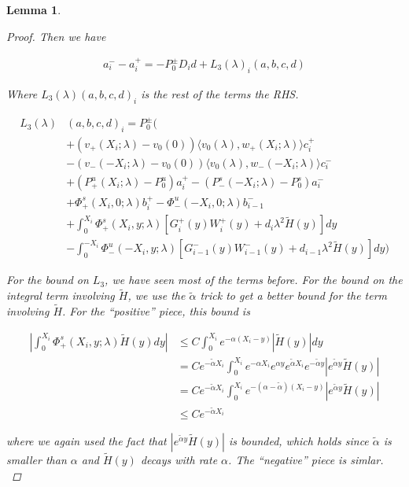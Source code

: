 \documentclass[12pt]{article}
\newtheorem{lemma}{Lemma}
\begin{document}
\begin{lemma}
\begin{proof}
Then we have

\begin{align*}
a_i^- - a_i^+ = -P_0^\pm D_i d + L_3(\lambda)_i(a, b, c, d)
\end{align*}

Where $L_3(\lambda)(a, b, c, d)_i$ is the rest of the terms the RHS.

\begin{align*}
L_3(\lambda)&(a, b, c, d)_i = P_0^\pm \Big( \\
&+(v_+(X_i; \lambda) - v_0(0)) \langle v_0(\lambda), w_+(X_i; \lambda) \rangle c_i^+ \\
&- (v_-(-X_i; \lambda) - v_0(0)) \langle v_0(\lambda), w_-(-X_i; \lambda) \rangle c_i^- \\
&+ (P^u_+(X_i; \lambda) - P_0^u)a_i^+ - (P^s_-(-X_i; \lambda) - P_0^s)a_i^- \\
&+ \Phi^s_+(X_i, 0; \lambda)b_i^+ - \Phi^u_-(-X_i, 0; \lambda)b_{i-1}^- \\
&+ \int_0^{X_i} \Phi^s_+(X_i, y; \lambda) [ G_i^+(y) W_i^+(y) + d_i \lambda^2 \tilde{H}(y) ] dy \\
&- \int_0^{-X_i} \Phi^u_-(-X_i, y; \lambda) [ G_{i-1}^-(y) W_{i-1}^-(y) + d_{i-1} \lambda^2 \tilde{H}(y) ] dy \Big)
\end{align*}

For the bound on $L_3$, we have seen most of the terms before. For the bound on the integral term involving $\tilde{H}$, we use the $\tilde{\alpha}$ trick to get a better bound for the term involving $\tilde{H}$. For the ``positive'' piece, this bound is

\begin{align*}
\left| \int_0^{X_i} \Phi^s_+(X_i, y; \lambda) \tilde{H}(y) dy \right| 
&\leq C \int_0^{X_i} e^{-\alpha (X_i - y)}|\tilde{H}(y)| dy \\
&= C e^{-\tilde{\alpha}X_i} \int_0^{X_i} e^{-\alpha X_i} e^{\alpha y}  e^{\tilde{\alpha}X_i} e^{-\tilde{\alpha}y} |e^{\tilde{\alpha}y} \tilde{H}(y)| \\
&= C e^{-\tilde{\alpha}X_i} \int_0^{X_i} e^{-(\alpha - \tilde{\alpha})(X_i-y)} |e^{\tilde{\alpha}y} \tilde{H}(y)|\\
&\leq C e^{-\tilde{\alpha}X_i} 
\end{align*}

where we again used the fact that $|e^{\tilde{\alpha}y} \tilde{H}(y)|$ is bounded, which holds since $\tilde{\alpha}$ is smaller than $\alpha$ and $\tilde{H}(y)$ decays with rate $\alpha$. The ``negative'' piece is simlar.\\


\end{proof}
\end{lemma}
\end{document}
